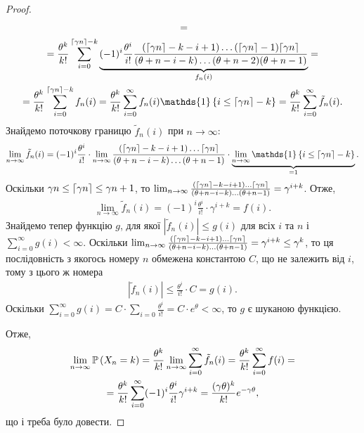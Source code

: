 \begin{proof}
\begin{gather*}
{        } = \\ =
        \frac{\theta^k}{k!}
        \sum_{i=0}^{\ceil*{\gamma n}-k} 
        \underbrace{(-1)^i \frac{\theta^i}{i!} \frac{
            (\ceil*{\g n} - k - i + 1) \dots (\ceil*{\g n} - 1) \ceil*{\g n}
        }{
            (\theta + n - i - k) \dots (\theta + n - 2)(\theta + n - 1)
        }}_{f_n(i)} = \\ = 
        \frac{\theta^k}{k!}
        \sum_{i=0}^{\ceil*{\gamma n}-k} f_n(i) =
        \frac{\theta^k}{k!} \sum_{i=0}^{\infty} f_n(i) \mathds{1}\left\{i \leq \ceil*{\gamma n}-k\right\} =
        \frac{\theta^k}{k!} \sum_{i=0}^{\infty} \tilde{f}_n(i).
    \end{gather*}
    Знайдемо поточкову границю $\tilde{f}_n(i)$ при $n \to \infty$:
    \begin{gather*}
        \lim_{n\to\infty} \tilde{f}_n(i) = (-1)^i \frac{\theta^i}{i!} \cdot
        \lim_{n\to\infty} \frac{
            (\ceil*{\g n} - k - i + 1) \dots \ceil*{\g n}
        }{
            (\theta + n - i - k) \dots (\theta + n - 1)
        } \cdot \underbrace{\lim_{n\to\infty} \mathds{1}\left\{i \leq \ceil*{\gamma n}-k\right\}}_{= 1}.
    \end{gather*}
    Оскільки $\gamma n \leq \ceil*{\gamma n} \leq \gamma n + 1$, то 
    $
    \lim_{n\to\infty} \frac{
        (\ceil*{\g n} - k - i + 1) \dots \ceil*{\g n}
    }{
        (\theta + n - i - k) \dots (\theta + n - 1)
    } = \gamma^{i + k}
    $. Отже, 
    \begin{gather*}
        \lim_{n\to\infty} \tilde{f}_n(i) = (-1)^i \frac{\theta^i}{i!} \cdot \gamma^{i + k} = f(i).
    \end{gather*}
    Знайдемо тепер функцію $g$, для якої $|\tilde{f}_n(i)| \leq g(i)$ для всіх $i$ та $n$
    і $\sum_{i=0}^{\infty} g(i) < \infty$.
    Оскільки 
    $
    \lim_{n\to\infty} \frac{
        (\ceil*{\g n} - k - i + 1) \dots \ceil*{\g n}
    }{
        (\theta + n - i - k) \dots (\theta + n - 1)
    } = \gamma^{i + k} \leq \gamma^k$, то 
    ця послідовність з якогось номеру $n$ обмежена константою $C$, що не залежить від $i$, тому
    з цього ж номера
    \begin{gather*}
        |\tilde{f}_n(i)| \leq \frac{\theta^i}{i!} \cdot C = g(i).
    \end{gather*}
    Оскільки $\sum_{i=0}^{\infty} g(i) = C \cdot \sum_{i=0} \frac{\theta^i}{i!} = C \cdot e^{\theta} < \infty$,
    то $g$ є шуканою функцією.

    Отже, 
    \begin{gather*}
        \lim_{n\to\infty} \P{X_n = k} = \frac{\theta^k}{k!} \lim_{n\to\infty} \sum_{i=0}^{\infty} \tilde{f}_n(i) =
        \frac{\theta^k}{k!} \sum_{i=0}^{\infty} f(i) = \\ = \frac{\theta^k}{k!} \sum_{i=0}^{\infty} (-1)^i \frac{\theta^i}{i!} \gamma^{i + k} = 
        \frac{(\gamma \theta)^k}{k!} e^{-\gamma \theta},
    \end{gather*}
    що і треба було довести.
\end{proof}
